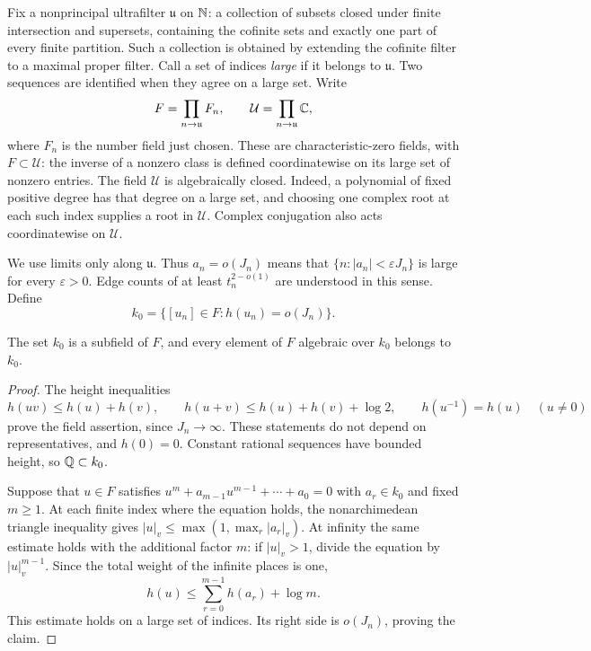 Fix a nonprincipal ultrafilter \(\mathfrak u\) on \(\mathbb N\): a collection of
subsets closed under finite intersection and supersets, containing the
cofinite sets and exactly one part of every finite partition. Such a
collection is obtained by extending the cofinite filter to a maximal
proper filter. Call a set of indices \emph{large} if it belongs to
\(\mathfrak u\). Two sequences are identified when they agree on a large
set. Write
\[
 F=\prod_{n\to\mathfrak u} F_n,
 \qquad
 \mathcal U=\prod_{n\to\mathfrak u}\mathbb C,
\]
where \(F_n\) is the number field just chosen. These are characteristic-zero
fields, with \(F\subset\mathcal U\): the inverse of a nonzero class is
defined coordinatewise on its large set of nonzero entries. The field
\(\mathcal U\) is algebraically closed. Indeed, a polynomial of fixed
positive degree has that degree on a large set, and choosing one complex
root at each such index supplies a root in \(\mathcal U\). Complex
conjugation also acts coordinatewise on \(\mathcal U\).

We use limits only along \(\mathfrak u\). Thus \(a_n=o(J_n)\) means that
\(\{n:\lvert a_n\rvert<\varepsilon J_n\}\) is large for every
\(\varepsilon>0\). Edge counts of at least \(t_n^{2-o(1)}\) are understood in this sense. Define
\[
 k_0=\bigl\{[u_n]\in F:h(u_n)=o(J_n)\bigr\}.
\]

\begin{lemma}\label{alg:small-height-field}
The set \(k_0\) is a subfield of \(F\), and every element of \(F\)
algebraic over \(k_0\) belongs to \(k_0\).
\end{lemma}

\begin{proof}
The height inequalities
\[
 h(uv)\le h(u)+h(v),\qquad
 h(u+v)\le h(u)+h(v)+\log 2,\qquad
 h(u^{-1})=h(u)\quad(u\ne0)
\]
prove the field assertion, since \(J_n\to\infty\). These statements do
not depend on representatives, and \(h(0)=0\). Constant rational
sequences have bounded height, so \(\mathbb Q\subset k_0\).

Suppose that \(u\in F\) satisfies
\(u^m+a_{m-1}u^{m-1}+\cdots+a_0=0\) with \(a_r\in k_0\) and fixed
\(m\ge1\). At each finite index where the equation holds, the
nonarchimedean triangle inequality gives
\(\lvert u\rvert_v\le\max(1,\max_r\lvert a_r\rvert_v)\). At infinity
the same estimate holds with the additional factor \(m\): if
\(\lvert u\rvert_v>1\), divide the equation by
\(\lvert u\rvert_v^{m-1}\). Since the total weight of the infinite
places is one,
\[
 h(u)\le\sum_{r=0}^{m-1}h(a_r)+\log m.
\]
This estimate holds on a large set of indices. Its right side is
\(o(J_n)\), proving the claim.
\end{proof}

